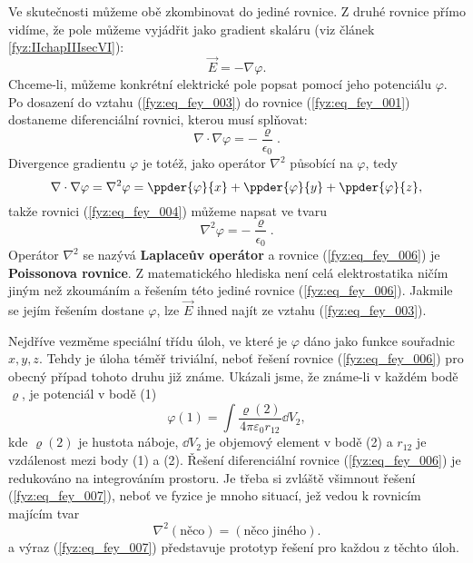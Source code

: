   Ve skutečnosti můžeme obě zkombinovat do jediné rovnice. Z druhé rovnice přímo vidíme, že pole 
  můžeme vyjádřit jako gradient skaláru (viz článek \ref{fyz:IIchapIIIsecVI}):
  \begin{equation}\label{fyz:eq_fey_003}
    \vec{E} = - \nabla\varphi.
  \end{equation}
  Chceme-li, můžeme konkrétní elektrické pole popsat pomocí jeho potenciálu \(\varphi\). Po 
  dosazení do vztahu (\ref{fyz:eq_fey_003}) do rovnice (\ref{fyz:eq_fey_001}) dostaneme 
  diferenciální rovnici, kterou musí splňovat:
  \begin{equation}\label{fyz:eq_fey_004}
  \nabla\cdot\nabla\varphi = - \dfrac{\varrho}{\epsilon_0}.
  \end{equation}
  Divergence gradientu \(\varphi\) je totéž, jako operátor \(\nabla^2\) působící na \(\varphi\), 
  tedy
  \begin{equation}\label{fyz:eq_fey_005}
  \nabla\cdot\nabla\varphi = \nabla^2\varphi 
    = \ppder{\varphi}{x} + \ppder{\varphi}{y} + \ppder{\varphi}{z},
  \end{equation}
  takže rovnici (\ref{fyz:eq_fey_004}) můžeme napsat ve tvaru
  \begin{equation}\label{fyz:eq_fey_006}
  \nabla^2\varphi = - \dfrac{\varrho}{\epsilon_0}.
  \end{equation}
  Operátor \(\nabla^2\) se nazývá \textbf{Laplaceův operátor} a rovnice (\ref{fyz:eq_fey_006}) je 
  \textbf{Poissonova rovnice}. Z matematického hlediska není celá elektrostatika ničím jiným než 
  zkoumáním a řešením této jediné rovnice (\ref{fyz:eq_fey_006}). Jakmile se jejím řešením 
  dostane \(\varphi\), lze \(\vec{E}\) ihned najít ze vztahu (\ref{fyz:eq_fey_003}).
  
  Nejdříve vezměme speciální třídu úloh, ve které je \(\varphi\) dáno jako funkce souřadnic \(x, 
  y, z\). Tehdy je úloha téměř triviální, neboť řešení rovnice (\ref{fyz:eq_fey_006}) pro obecný 
  případ tohoto druhu již známe. Ukázali jsme, že známe-li v každém bodě \(\varrho\), je 
  potenciál v bodě (1)
  \begin{equation}\label{fyz:eq_fey_007}
  \varphi(1) = \int{\dfrac{\varrho(2)}{4\pi\varepsilon_0r_{12}}}\dd{V_2},
  \end{equation}
  kde \(\varrho(2)\) je hustota náboje, \(\dd{V_2}\) je objemový element v bodě (2) a \(r_{12}\) je
  vzdálenost mezi body (1) a (2). Řešení diferenciální rovnice (\ref{fyz:eq_fey_006}) je redukováno
  na integrováním prostoru. Je třeba si zvláště všimnout řešení (\ref{fyz:eq_fey_007}), neboť ve
  fyzice je mnoho situací, jež vedou k rovnicím majícím tvar
  \begin{equation}\label{fyz:eq_fey_008}
  \nabla^2(\text{něco}) = (\text{něco jiného}).
  \end{equation}
  a výraz (\ref{fyz:eq_fey_007}) představuje prototyp řešení pro každou z těchto úloh.
  
